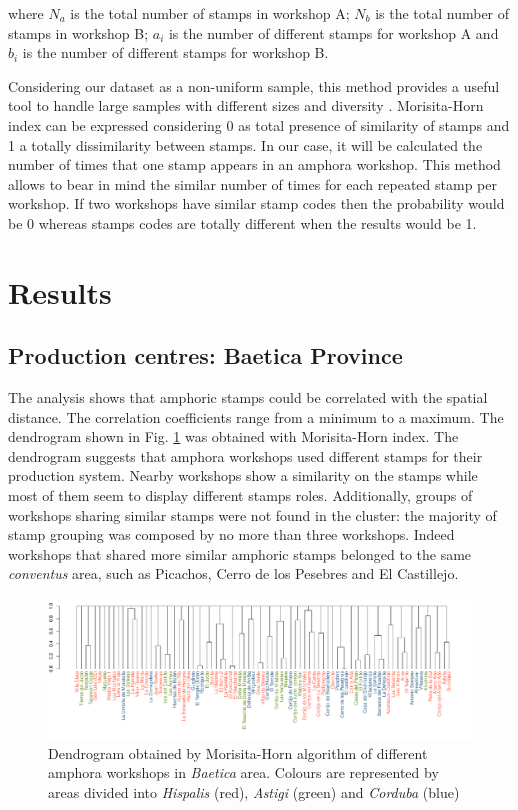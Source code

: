 \documentclass[review]{elsarticle}
\begin{document}
where $N_{a}$ is the total number of stamps in workshop A; $N_{b}$ is the total number of stamps in workshop B; $a_{i}$ is the number of different stamps for workshop A and $b_{i}$ is the number of different stamps for workshop B.

Considering our dataset as a non-uniform sample, this method provides a useful tool to handle large samples with different sizes and diversity \citep{wolda_similarity_1981}. Morisita-Horn index can be expressed considering 0 as total presence of similarity of stamps and 1 a totally dissimilarity between stamps. In our case, it will be calculated the number of times that one stamp appears in an amphora workshop. This method allows to bear in mind the similar number of times for each repeated stamp per workshop. If two workshops have similar stamp codes then the probability would be 0 whereas stamps codes are totally different when the results would be 1. 


\section{Results}

\subsection{Production centres: Baetica Province}

The analysis shows that amphoric stamps could be correlated with the spatial distance. The correlation coefficients range from a minimum to a maximum. The dendrogram shown in Fig. \ref{dendro} was obtained with Morisita-Horn index. The dendrogram suggests that amphora workshops used different stamps for their production system. Nearby workshops show a similarity on the stamps while most of them seem to display different stamps roles. Additionally, groups of workshops sharing similar stamps were not found in the cluster: the majority of stamp grouping was composed by no more than three workshops. Indeed workshops that shared more similar amphoric stamps belonged to the same \textit{conventus} area, such as Picachos, Cerro de los Pesebres and El Castillejo. 

\begin{figure}[htp]
	\centering
\includegraphics[width=\linewidth]{figs/dendro}
\caption{Dendrogram obtained by Morisita-Horn algorithm of different amphora workshops in \textit{Baetica} area. Colours are represented by areas divided into \textit{Hispalis} (red), \textit{Astigi} (green) and \textit{Corduba} (blue)}
\label{dendro}
\end{figure} 
\end{document}
